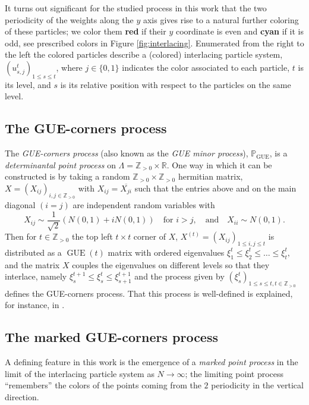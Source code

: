 \documentclass[11pt]{article}
\theoremstyle{plain}
\theoremstyle{definition}
\numberwithin{equation}{section}
\newcommand{\ZZ}{\mathbb{Z}}
\newcommand{\PP}{\mathbb{P}}
\DeclareMathOperator{\GUE}{GUE}
\begin{document}
It turns out significant for the studied process in this work that the two periodicity of the weights along the $y$ axis gives rise to a natural further coloring of these particles;  we color them \textbf{red} if their $y$ coordinate is even and \textbf{cyan} if it is odd, see prescribed colors in Figure \ref{fig:interlacing}.
Enumerated from the right to the left the colored particles describe a (colored) interlacing particle system, $(u_{s,j}^t)_{1\leq s\leq t}$, where $j\in\{0,1\}$ indicates the color associated to each particle, $t$ is its level, and $s$ is its relative position with respect to the particles on the same level. 




\subsection{The GUE-corners process}
The \textit{ GUE-corners process}  (also known as the \textit{GUE minor process}), $\PP_{\operatorname{GUE}}$, is a \textit{determinantal point process} on $\Lambda=\ZZ_{>0}\times \mathbb{R}$.
%
One way in which it can be constructed is by taking a random $\ZZ_{>0}\times \ZZ_{>0}$ hermitian matrix, $X=(X_{ij})_{i,j\in\ZZ_{>0}}$ with $X_{ij}=\overline{X_{ji}}$ such that the entries above and on the main diagonal $(i=j)$ are independent random variables with
$$X_{ij}\sim \frac{1}{\sqrt{2}}( N(0,1)+i N(0,1))\quad \text{for } i>j,\quad \text{and}\quad X_{ii}\sim N(0,1).$$
Then for $t\in\ZZ_{>0}$ the top left $t\times t$ corner of  $X$, $X^{(t)}=(X_{ij})_{1\leq i,j \leq t}$ is distributed as a $\GUE(t)$ matrix with ordered eigenvalues 
$\xi_1^t\leq \xi_2^t\leq\ldots \leq \xi_t^t,$
and the matrix $X$ couples the eigenvalues on different levels so that they interlace, namely 
 $\xi_s^{t+1}\leq \xi_s^t\leq \xi_{s+1}^{t+1}$ and the process given by 
$\left(\xi_s^{t} \right)_{1\leq s \leq t,  t\in{\ZZ_{>0}}}$ defines the GUE-corners process. That this process is well-defined is explained, for instance, in \cite{JN06}. 

\subsection{The marked GUE-corners process}
A defining feature in this work is the emergence of a \emph{marked point process} in the limit of the interlacing particle system as $N\rightarrow\infty$; the limiting point process ``remembers'' the colors of the points coming from the $2$ periodicity in the vertical direction. 
\end{document}
